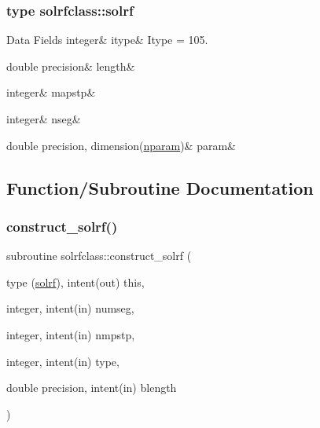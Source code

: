 \subsubsection{type solrfclass\+::solrf}
\begin{DoxyFields}{Data Fields}
\mbox{\label{namespacesolrfclass_af3ec222ea47a2e9d6dea703d94927750}} 
integer&
itype&
Itype = 105. \\
\hline

\mbox{\label{namespacesolrfclass_a6fbb4ce6f8918840cadf9ee8e16769f9}} 
double precision&
length&
\\
\hline

\mbox{\label{namespacesolrfclass_af5533539dedb70fb85e93b1a76a7a55d}} 
integer&
mapstp&
\\
\hline

\mbox{\label{namespacesolrfclass_a1825472ba9b6dfe1d7ca72bfc85f0532}} 
integer&
nseg&
\\
\hline

\mbox{\label{namespacesolrfclass_a10deafd1e7cbd79c86c62766f73105f9}} 
double precision, dimension(\mbox{\hyperlink{namespacesolrfclass_a01b965e25069cff9fb1797fbbcb9939d}{nparam}})&
param&
\\
\hline

\end{DoxyFields}


\subsection{Function/\+Subroutine Documentation}
\mbox{\label{namespacesolrfclass_a3d7deb451633bf4e6fc42e0b43f21e2e}} 
\subsubsection{\texorpdfstring{construct\_solrf()}{construct\_solrf()}}
{\footnotesize\ttfamily subroutine solrfclass\+::construct\+\_\+solrf (\begin{DoxyParamCaption}\item[{type (\mbox{\hyperlink{namespacesolrfclass_structsolrfclass_1_1solrf}{solrf}}), intent(out)}]{this,  }\item[{integer, intent(in)}]{numseg,  }\item[{integer, intent(in)}]{nmpstp,  }\item[{integer, intent(in)}]{type,  }\item[{double precision, intent(in)}]{blength }\end{DoxyParamCaption})}

